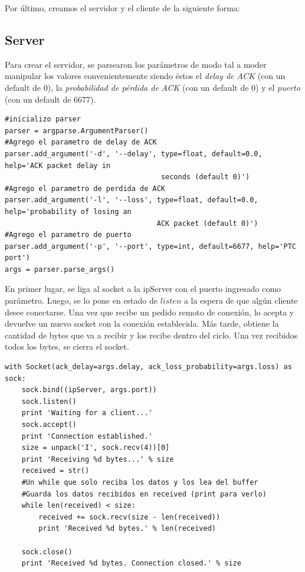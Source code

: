 \documentclass[10pt, a4paper]{article}
\begin{document}
Por último, creamos el servidor y el cliente de la siguiente forma:

\subsection{Server}

Para crear el servidor, se parsearon los parámetros de modo tal a moder manipular los valores convenientemente siendo éstos el \textit{delay de ACK} (con un default de 0), la \textit{probabilidad de pérdida de ACK} (con un default de 0) y el \textit{puerto} (con un default de 6677).

\begin{verbatim}
#inicializo parser
parser = argparse.ArgumentParser()
#Agrego el parametro de delay de ACK
parser.add_argument('-d', '--delay', type=float, default=0.0, help='ACK packet delay in
									 seconds (default 0)')
#Agrego el parametro de perdida de ACK
parser.add_argument('-l', '--loss', type=float, default=0.0, help='probability of losing an 
									ACK packet (default 0)')
#Agrego el parametro de puerto
parser.add_argument('-p', '--port', type=int, default=6677, help='PTC port')
args = parser.parse_args()
\end{verbatim}

En primer lugar, se liga al socket a la ipServer con el puerto ingresado como parámetro. Luego, se lo pone en estado de $listen$ a la espera de que algún cliente desee conectarse. Una vez que recibe un pedido remoto de conexión, lo acepta y devuelve un nuevo socket con la conexión establecida. Más tarde, obtiene la cantidad de bytes que va a recibir y los recibe dentro del ciclo. Una vez recibidos todos los bytes, se cierra el socket.

\begin{verbatim}
with Socket(ack_delay=args.delay, ack_loss_probability=args.loss) as sock:
    sock.bind((ipServer, args.port))
    sock.listen()
    print 'Waiting for a client...'
    sock.accept()
    print 'Connection established.'
    size = unpack('I', sock.recv(4))[0]
    print 'Receiving %d bytes...' % size
    received = str()
    #Un while que solo reciba los datos y los lea del buffer
    #Guarda los datos recibidos en received (print para verlo)
    while len(received) < size:
        received += sock.recv(size - len(received))
        print 'Received %d bytes.' % len(received)

    sock.close()
    print 'Received %d bytes. Connection closed.' % size
\end{verbatim}
\end{document}
